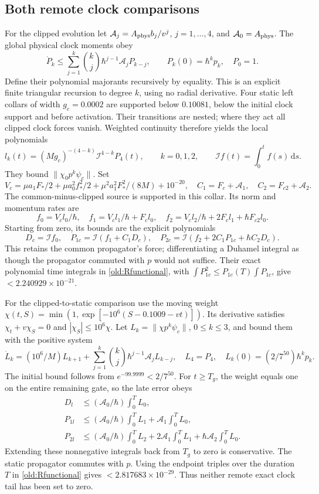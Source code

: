 \documentclass[11pt]{article}
\theoremstyle{definition}\newtheorem{definition}[theorem]{Definition}
\theoremstyle{remark}\newtheorem{remark}[theorem]{Remark}
\newcommand{\dd}{\,\mathrm d}\newcommand{\Imv}{\operatorname{Im}}\newcommand{\ii}{\mathrm i}
\begin{document}
\subsection{Both remote clock comparisons}
\label{old:tails}
For the clipped evolution let $\mathcal A_j=A_{\rm phys}b_j/v^j$,
$j=1,\ldots,4$, and $\mathcal A_0=A_{\rm phys}$.
The global physical clock moments obey
\[
 \dot P_k\leq\sum_{j=1}^k\binom kj\hbar^{j-1}\mathcal A_jP_{k-j},
 \qquad P_k(0)=\hbar^kp_k,\quad P_0=1.
\]
Define their polynomial majorants recursively by equality. This is an
explicit finite triangular recursion to degree $k$, using no radial
derivative. Four static left collars of width $g_c=0.0002$ are supported
below $0.10081$, below the initial clock support and before activation.
Their transitions are nested; where they act all clipped clock forces
vanish. Weighted continuity therefore yields the local polynomials
\[
 l_k(t)=(Mg_c)^{-(4-k)}\mathcal I^{4-k}P_4(t),
 \qquad k=0,1,2,\qquad \mathcal I f(t)=\int_0^t f(s)\dd s.
\]
They bound $\|\chi_0p^k\psi_c\|$. Set
\[
 V_c=\mu a_1F_*/2+\mu a_0^2f_*^2/2
                +\mu^2a_1^2F_*^2/(8M)+10^{-20},
 \quad C_1=F_c+\mathcal A_1,\quad C_2=F_{c2}+\mathcal A_2.
\]
The common-minus-clipped source is supported in this collar.
Its norm and momentum rates are
\[
 f_0=V_cl_0/\hbar,\quad f_1=V_cl_1/\hbar+F_cl_0,
 \quad f_2=V_cl_2/\hbar+2F_cl_1+\hbar F_{c2}l_0.
\]
Starting from zero, its bounds are the explicit polynomials
\[
 D_c=\mathcal I f_0,\quad P_{1c}=\mathcal I(f_1+C_1D_c),\quad
 P_{2c}=\mathcal I(f_2+2C_1P_{1c}+\hbar C_2D_c).
\]
This retains the common propagator's force; differentiating a Duhamel
integral as though the propagator commuted with $p$ would not suffice.
Their exact polynomial time integrals in \eqref{old:Rfunctional}, with
$\int P_{1c}^2\leq P_{1c}(T)\int P_{1c}$, give
$<2.240929\times10^{-21}$.

For the clipped-to-static comparison use the moving weight
$\chi(t,S)=\min(1,\exp[-10^6(S-0.1009-vt)])$.
Its derivative satisfies $\chi_t+v\chi_S=0$ and
$|\chi_S|\leq10^6\chi$. Let $L_k=\|\chi p^k\psi_c\|$,
$0\leq k\leq3$, and bound them with the positive system
\[
 \dot L_k=(10^6/M)L_{k+1}
   +\sum_{j=1}^k\binom kj\hbar^{j-1}\mathcal A_jL_{k-j},
 \quad L_4=P_4,\quad L_k(0)=(2/7^{50})\hbar^kp_k.
\]
The initial bound follows from $e^{-99.9999}<2/7^{50}$.
For $t\geq T_g$, the weight equals one on the entire remaining gate,
so the late error obeys
\begin{align*}
 D_l&\leq(\mathcal A_0/\hbar)\int_0^T L_0,\\
 P_{1l}&\leq(\mathcal A_0/\hbar)\int_0^T L_1
                                  +\mathcal A_1\int_0^T L_0,\\
 P_{2l}&\leq(\mathcal A_0/\hbar)\int_0^T L_2
                    +2\mathcal A_1\int_0^T L_1
                    +\hbar\mathcal A_2\int_0^T L_0.
\end{align*}
Extending these nonnegative integrals back from $T_g$ to zero is
conservative. The static propagator commutes with $p$.
Using the endpoint triples over the duration $T$ in
\eqref{old:Rfunctional} gives $<2.817683\times10^{-29}$.
Thus neither remote exact clock tail has been set to zero.
\end{document}
